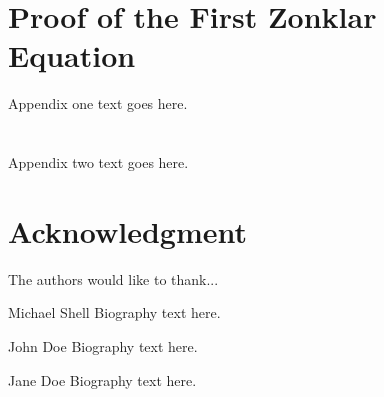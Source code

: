 \documentclass[journal,transmag]{IEEEtran}
\begin{document}
\section{Proof of the First Zonklar Equation}
Appendix one text goes here.
\section{}
Appendix two text goes here.
\section*{Acknowledgment}
The authors would like to thank...
\ifCLASSOPTIONcaptionsoff
  \newpage
\fi
{}
\begin{IEEEbiography}{Michael Shell}
Biography text here.
\end{IEEEbiography}
\begin{IEEEbiographynophoto}{John Doe}
Biography text here.
\end{IEEEbiographynophoto}
\begin{IEEEbiographynophoto}{Jane Doe}
Biography text here.
\end{IEEEbiographynophoto}
\end{document}
